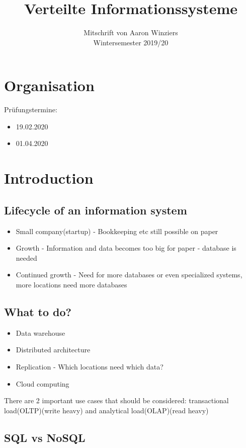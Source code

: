 \documentclass[10pt,a4paper]{article}
\author{Mitschrift von Aaron Winziers\\
	Wintersemester 2019/20}
\title{Verteilte Informationssysteme}
\date{}
\begin{document}
	\maketitle
	\section{Organisation}
	Prüfungstermine:
	\begin{itemize}
		\item 19.02.2020
		\item 01.04.2020
	\end{itemize}

	
\section{Introduction}
\subsection{Lifecycle of an information system}
	\begin{itemize}
		\item Small company(startup) - Bookkeeping etc still possible on paper
		\item Growth - Information and data becomes too big for paper - database is
		needed
		\item Continued growth - Need for more databases or even specialized systems,
		more locations need more databases
	\end{itemize}
\subsection{What to do?}
	\begin{itemize}
		\item Data warehouse
		\item Distributed architecture
		\item Replication - Which locations need which data?
		\item Cloud computing
	\end{itemize}
	
	There are 2 important use cases that should be considered:
	transactional load(OLTP)(write heavy) and analytical load(OLAP)(read heavy)
	
\subsection{SQL vs NoSQL}
\end{document}
